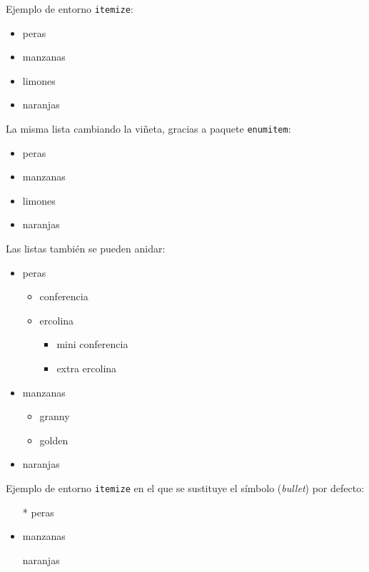 \documentclass[ 		%
	11pt,				%
	a4paper,			%
	twoside,			%
	openright,			%
	final       		%
]{book}
\begin{document}
\noindent Ejemplo de entorno {\tt itemize}:
\begin{itemize}
	\item peras
	\item manzanas
    \item 	limones
    \item 	naranjas
\end{itemize}

\noindent La misma lista cambiando la viñeta, gracias a paquete \texttt{enumitem}:
\begin{itemize}[]
	\item peras
	\item manzanas
	\item limones
	\item naranjas
\end{itemize}


Las listas también se pueden anidar:
\begin{itemize}
	\item peras
	\begin{itemize}
		\item conferencia
		\item ercolina
    	\begin{itemize}
    		\item mini conferencia
    		\item extra ercolina
    	\end{itemize}
	\end{itemize}
	\item manzanas
	\begin{itemize}
		\item granny
		\item golden 
	\end{itemize}
	\item naranjas
\end{itemize}


\noindent Ejemplo de entorno {\tt itemize} en el que se sustituye el símbolo (\emph{bullet}) por defecto:

\begin{itemize}
	\item[*] peras
	\item manzanas
	\item[\ding{170}] naranjas
\end{itemize}
\end{document}
